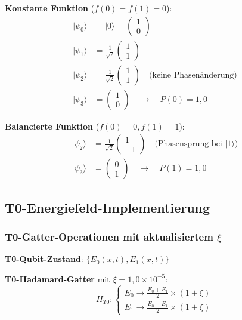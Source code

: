 \documentclass[12pt,a4paper]{article}
\newcommand{\Efield}{E}
\begin{document}
	\textbf{Konstante Funktion} ($f(0) = f(1) = 0$):
	\begin{align}
		|\psi_0\rangle &= |0\rangle = \begin{pmatrix} 1 \\ 0 \end{pmatrix} \\
		|\psi_1\rangle &= \frac{1}{\sqrt{2}}\begin{pmatrix} 1 \\ 1 \end{pmatrix} \\
		|\psi_2\rangle &= \frac{1}{\sqrt{2}}\begin{pmatrix} 1 \\ 1 \end{pmatrix} \quad \text{(keine Phasenänderung)} \\
		|\psi_3\rangle &= \begin{pmatrix} 1 \\ 0 \end{pmatrix} \quad \rightarrow \quad P(0) = 1,0
	\end{align}
	
	\textbf{Balancierte Funktion} ($f(0) = 0, f(1) = 1$):
	\begin{align}
		|\psi_2\rangle &= \frac{1}{\sqrt{2}}\begin{pmatrix} 1 \\ -1 \end{pmatrix} \quad \text{(Phasensprung bei } |1\rangle\text{)} \\
		|\psi_3\rangle &= \begin{pmatrix} 0 \\ 1 \end{pmatrix} \quad \rightarrow \quad P(1) = 1,0
	\end{align}
	
	\subsection{T0-Energiefeld-Implementierung}
	
	\subsubsection{T0-Gatter-Operationen mit aktualisiertem $\xi$}
	
	\textbf{T0-Qubit-Zustand}: $\{\Efield_0(x,t), \Efield_1(x,t)\}$
	
	\textbf{T0-Hadamard-Gatter} mit $\xi = 1,0 \times 10^{-5}$:
	\begin{equation}
		H_{T0}: \begin{cases}
			\Efield_0 \rightarrow \frac{\Efield_0 + \Efield_1}{2} \times (1 + \xi) \\
			\Efield_1 \rightarrow \frac{\Efield_0 - \Efield_1}{2} \times (1 + \xi)
		\end{cases}
	\end{equation}
	
\end{document}
